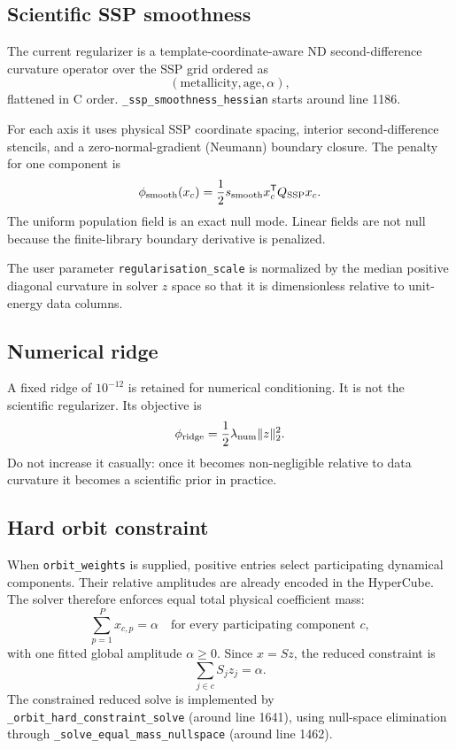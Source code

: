 \documentclass[10pt,a4paper]{article}
\newcommand{\code}[1]{\texttt{#1}}
\begin{document}
\subsection{Scientific SSP smoothness}
The current regularizer is a template-coordinate-aware ND second-difference curvature operator over the SSP grid ordered as
\[
(\mathrm{metallicity},\mathrm{age},\alpha),
\]
flattened in C order. \code{\_ssp\_smoothness\_hessian} starts around line 1186.

For each axis it uses physical SSP coordinate spacing, interior second-difference stencils, and a zero-normal-gradient (Neumann) boundary closure. The penalty for one component is
\[
\phi_{\rm smooth}(x_c)=\frac{1}{2}s_{\rm smooth}x_c^{\mathsf T}Q_{\rm SSP}x_c.
\]
The uniform population field is an exact null mode. Linear fields are not null because the finite-library boundary derivative is penalized.

The user parameter \code{regularisation\_scale} is normalized by the median positive diagonal curvature in solver $z$ space so that it is dimensionless relative to unit-energy data columns.

\subsection{Numerical ridge}
A fixed ridge of $10^{-12}$ is retained for numerical conditioning. It is not the scientific regularizer. Its objective is
\[
\phi_{\rm ridge}=\frac12\lambda_{\rm num}\lVert z\rVert_2^2.
\]
Do not increase it casually: once it becomes non-negligible relative to data curvature it becomes a scientific prior in practice.

\subsection{Hard orbit constraint}
When \code{orbit\_weights} is supplied, positive entries select participating dynamical components. Their relative amplitudes are already encoded in the HyperCube. The solver therefore enforces equal total physical coefficient mass:
\[
\sum_{p=1}^{P}x_{c,p}=\alpha \quad \text{for every participating component }c,
\]
with one fitted global amplitude $\alpha\ge0$. Since $x=Sz$, the reduced constraint is
\[
\sum_{j\in c}S_jz_j=\alpha.
\]
The constrained reduced solve is implemented by \code{\_orbit\_hard\_constraint\_solve} (around line 1641), using null-space elimination through \code{\_solve\_equal\_mass\_nullspace} (around line 1462).
\end{document}
